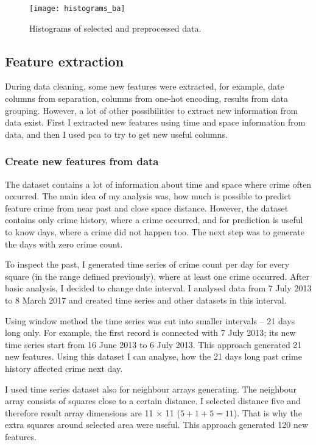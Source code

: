 \documentclass[thesis=M,english]{FITthesis}[2012/10/20]
\begin{document}
\begin{figure}[ht]\centering
    \texttt{[image: histograms\_ba]}
    \caption{Histograms of selected and preprocessed data.}\label{fig:histograms_ba}
\end{figure}

\subsection{Feature extraction}

During data cleaning, some new features were extracted, for example, date columns from separation, columns from one-hot encoding, results from data grouping. However, a lot of other possibilities to extract new information from data exist. First I extracted new features using time and space information from data, and then I used \gls{pca} to try to get new useful columns.

\subsubsection{Create new features from data}

The dataset contains a lot of information about time and space where crime often occurred. The main idea of my analysis was, how much is possible to predict feature crime from near past and close space distance. However, the dataset contains only crime history, where a crime occurred, and for prediction is useful to know days, where a crime did not happen too. The next step was to generate the days with zero crime count. 

To inspect the past, I generated time series of crime count per day for every square (in the range defined previously), where at least one crime occurred. After basic analysis, I decided to change date interval. I analysed data from 7 July 2013 to 8 March 2017 and created time series and other datasets in this interval.

Using window method the time series was cut into smaller intervals -- 21 days long only. For example, the first record is connected with 7 July 2013; its new time series start from 16 June 2013 to 6 July 2013. This approach generated 21 new features. Using this dataset I can analyse, how the 21 days long past crime history affected crime next day. 

I used time series dataset also for neighbour arrays generating. The neighbour array consists of squares close to a certain distance. I selected distance five and therefore result array dimensions are 11 $\times$ 11 ($5 + 1 + 5 = 11$). That is why the extra squares around selected area were useful. This approach generated 120 new features. 
\end{document}

